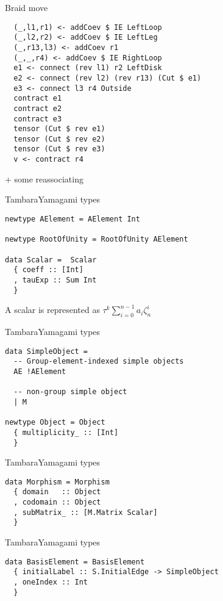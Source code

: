 \documentclass{beamer}
\begin{document}
\begin{frame}[fragile]{Braid move}
\begin{verbatim}
  (_,l1,r1) <- addCoev $ IE LeftLoop
  (_,l2,r2) <- addCoev $ IE LeftLeg
  (_,r13,l3) <- addCoev r1
  (_,_,r4) <- addCoev $ IE RightLoop
  e1 <- connect (rev l1) r2 LeftDisk
  e2 <- connect (rev l2) (rev r13) (Cut $ e1)
  e3 <- connect l3 r4 Outside
  contract e1                   
  contract e2
  contract e3
  tensor (Cut $ rev e1)
  tensor (Cut $ rev e2)
  tensor (Cut $ rev e3)
  v <- contract r4
\end{verbatim}
+ some reassociating 
\end{frame}


\begin{frame}[fragile]{TambaraYamagami types}
\begin{verbatim}
newtype AElement = AElement Int 

newtype RootOfUnity = RootOfUnity AElement

data Scalar =  Scalar 
  { coeff :: [Int]
  , tauExp :: Sum Int
  } 
\end{verbatim}

A scalar is represented as $\tau^k \sum_{i=0}^{n-1} a_i \zeta_n^i$
\end{frame}

\begin{frame}[fragile]{TambaraYamagami types}
\begin{verbatim}
data SimpleObject =
  -- Group-element-indexed simple objects
  AE !AElement

  -- non-group simple object
  | M

newtype Object = Object
  { multiplicity_ :: [Int]
  }
\end{verbatim}
\end{frame}

\begin{frame}[fragile]{TambaraYamagami types}
\begin{verbatim}
data Morphism = Morphism 
  { domain   :: Object
  , codomain :: Object
  , subMatrix_ :: [M.Matrix Scalar]
  }
\end{verbatim}
\end{frame}

\begin{frame}[fragile]{TambaraYamagami types}
\begin{verbatim}
data BasisElement = BasisElement
  { initialLabel :: S.InitialEdge -> SimpleObject
  , oneIndex :: Int
  }
\end{verbatim}
\end{frame}
\end{document}
